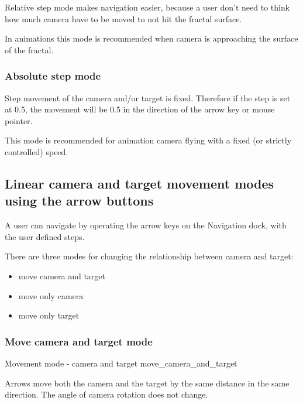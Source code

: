 Relative step mode makes navigation easier, because a user don't need to think
how much camera have to be moved to not hit the fractal surface.

In animations this mode is recommended when camera is approaching the surface of
the fractal.

\subsubsection{Absolute step mode}\label{absolute-step-mode}

Step movement of the camera and/or target is fixed. Therefore if the step is set
at 0.5, the movement will be 0.5 in the direction of the arrow key or mouse
pointer.

This mode is recommended for animation camera flying with a fixed (or strictly
controlled) speed.

\subsection{Linear camera and target movement modes using the arrow
	buttons}\label{linear-camera-and-target-movement-modes-using-the-arrow-buttons}

A user can navigate by operating the arrow keys on the Navigation dock, with the
user defined steps.

There are three modes for changing the relationship between camera and target:

\begin{multicols}{3}
\begin{itemize}
	\item move camera and target
	\item move only camera
	\item move only target
\end{itemize}
\end{multicols}

\subsubsection{Move camera and target mode}\label{move-camera-and-target-mode}

{Movement mode - camera and target}
{move_camera_and_target}

Arrows move both the camera and the target by the same distance in the same
direction. The angle of camera rotation does not change.

